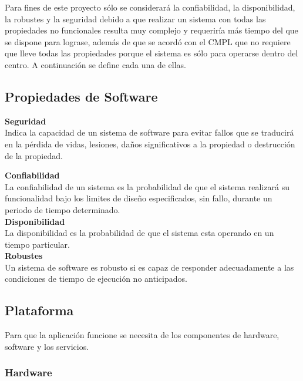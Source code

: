 Para fines de este proyecto sólo se considerará la confiabilidad, la disponibilidad, la robustes y la seguridad debido a que realizar un sistema con todas las propiedades no funcionales resulta muy complejo y requeriría más tiempo del que se dispone para lograse, además de que se acordó con el CMPL que no requiere que lleve todas las propiedades porque el sistema es sólo para operarse dentro del centro. A continuación se define cada una de ellas.

\subsection{Propiedades de Software}

\textbf{Seguridad\\}
Indica la capacidad de un sistema de software para evitar fallos que se traducirá en la pérdida de vidas, lesiones, daños significativos a la propiedad o destrucción de la propiedad\cite{Seguridad}.

\textbf{Confiabilidad\\}
La confiabilidad de un sistema es la probabilidad de que el sistema realizará su funcionalidad bajo los limites de diseño especificados, sin fallo, durante un periodo de tiempo determinado\cite{Seguridad}.\\

\textbf{Disponibilidad\\}
La disponibilidad es la probabilidad de que el sistema esta operando en un tiempo particular\cite{Seguridad}.\\ 

\textbf{Robustes\\}
Un sistema de software es robusto si es capaz de responder adecuadamente a las condiciones de tiempo de ejecución no anticipados\cite{Seguridad}.\\

\subsection{Plataforma}
Para que la aplicación funcione se necesita de los componentes de hardware, software y los servicios. \\

\subsubsection{Hardware}

